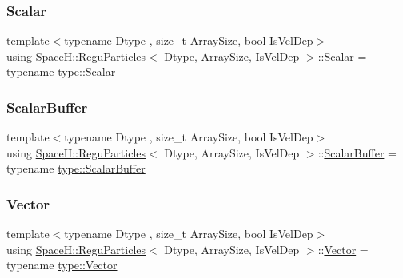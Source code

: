 \subsubsection{\texorpdfstring{Scalar}{Scalar}}
{\footnotesize\ttfamily template$<$typename Dtype , size\+\_\+t Array\+Size, bool Is\+Vel\+Dep$>$ \\
using \mbox{\hyperlink{class_space_h_1_1_regu_particles}{Space\+H\+::\+Regu\+Particles}}$<$ Dtype, Array\+Size, Is\+Vel\+Dep $>$\+::\mbox{\hyperlink{class_space_h_1_1_vel_indep_particles_aeb47d8131b30ed790320ff634f0d6af1}{Scalar}} =  typename type\+::\+Scalar}

\mbox{\label{class_space_h_1_1_regu_particles_a49987a2ea42df368ebbf75200efc5439}} 
\subsubsection{\texorpdfstring{Scalar\+Buffer}{ScalarBuffer}}
{\footnotesize\ttfamily template$<$typename Dtype , size\+\_\+t Array\+Size, bool Is\+Vel\+Dep$>$ \\
using \mbox{\hyperlink{class_space_h_1_1_regu_particles}{Space\+H\+::\+Regu\+Particles}}$<$ Dtype, Array\+Size, Is\+Vel\+Dep $>$\+::\mbox{\hyperlink{class_space_h_1_1_vel_indep_particles_abca40159a816385790d5a6fd19c1dc6d}{Scalar\+Buffer}} =  typename \mbox{\hyperlink{struct_space_h_1_1_proto_type_a62c491884996da10377d348a5aabad86}{type\+::\+Scalar\+Buffer}}}

\mbox{\label{class_space_h_1_1_regu_particles_aefe83926ebdcf1f06d980d02a44fe486}} 
\subsubsection{\texorpdfstring{Vector}{Vector}}
{\footnotesize\ttfamily template$<$typename Dtype , size\+\_\+t Array\+Size, bool Is\+Vel\+Dep$>$ \\
using \mbox{\hyperlink{class_space_h_1_1_regu_particles}{Space\+H\+::\+Regu\+Particles}}$<$ Dtype, Array\+Size, Is\+Vel\+Dep $>$\+::\mbox{\hyperlink{class_space_h_1_1_vel_indep_particles_a61bbcfdb0dc7f99f3c68af69a755c935}{Vector}} =  typename \mbox{\hyperlink{struct_space_h_1_1_proto_type_a316b81f4660b2b4fab14a8e1f23b6089}{type\+::\+Vector}}}

